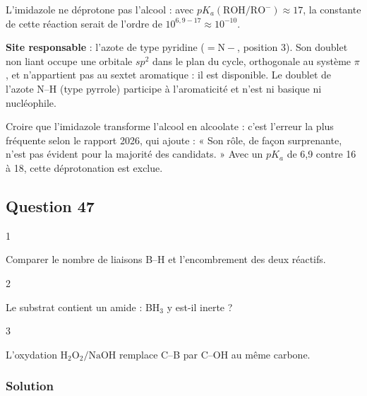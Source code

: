 \documentclass[11pt,a4paper]{article}
\begin{document}
L'imidazole ne déprotone pas l'alcool : avec \(pK_a(\mathrm{ROH/RO^-})\approx17\), la constante de cette réaction serait de l'ordre de \(10^{6{,}9-17}\approx10^{-10}\).

\textbf{Site responsable} : l'azote de type pyridine (\(\mathrm{{=}N{-}}\), position 3). Son doublet non liant occupe une orbitale \(sp^2\) dans le plan du cycle, orthogonale au système \(\pi\), et n'appartient pas au sextet aromatique : il est disponible. Le doublet de l'azote N--H (type pyrrole) participe à l'aromaticité et n'est ni basique ni nucléophile.

\begin{piege}

Croire que l'imidazole transforme l'alcool en alcoolate : c'est l'erreur la plus fréquente selon le rapport 2026, qui ajoute : « Son rôle, de façon surprenante, n'est pas évident pour la majorité des candidats. » Avec un \(pK_a\) de 6,9 contre 16 à 18, cette déprotonation est exclue.

\end{piege}

\hypertarget{question-47}{%
\subsection{Question 47}\label{question-47}}

\begin{indication}{1}

Comparer le nombre de liaisons B--H et l'encombrement des deux réactifs.

\end{indication}

\begin{indication}{2}

Le substrat contient un amide : BH\(_3\) y est-il inerte ?

\end{indication}

\begin{indication}{3}

L'oxydation \(\mathrm{H_2O_2/NaOH}\) remplace C--B par C--OH au même carbone.

\end{indication}

\hypertarget{solution-46}{%
\subsubsection{Solution}\label{solution-46}}
\end{document}

